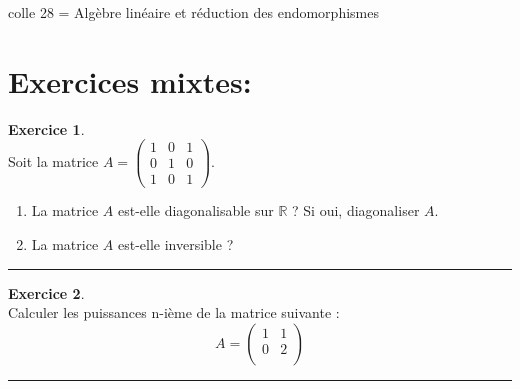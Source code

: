 \documentclass[a4paper,10pt]{article}
\theoremstyle{definition}
\theoremstyle{definition}
\newtheorem{exo}{Exercice}
\begin{document}
 	

\begin{center}
\Large \sc colle 28 = Algèbre linéaire et réduction des endomorphismes
\end{center}

\section*{Exercices mixtes:}%

\raggedright

\begin{exo}\quad\\[0.25cm]
	Soit la matrice $A=\begin{pmatrix}
	1&0&1\\0&1&0\\1&0&1
	\end{pmatrix}$. 
	\begin{enumerate}
		\item  La matrice $A$ est-elle diagonalisable sur $\mathbb{R}$ ? Si oui, diagonaliser $A$.
		\item  La matrice $A$ est-elle inversible ?
	\end{enumerate}	
	
	\centering
	\rule{1\linewidth}{0.6pt}
\end{exo}

\begin{exo}\quad\\[0.25cm]
	Calculer les puissances n-ième de la matrice suivante : 
	$$A  =  \begin{pmatrix}
	1 & 1 \\
	0 &  2\\
	
\end{pmatrix} $$
	\centering
	\rule{1\linewidth}{0.6pt}
\end{exo}			
\end{document}
